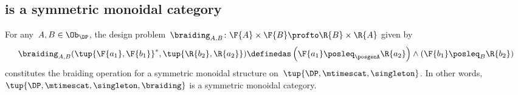 \subsection{\DP is a symmetric monoidal category}
\begin{lemma}
  \label{lem:symmetricmonoidaldp}
  For any~$A,B \in\Ob_\DP$, the design problem~$\braiding_{A,B}\colon \F{A} \times \F{B} \profto \R{B} \times \R{A}$ given by
  \begin{equation}
    \braiding_{A,B}(\tup{\F{a_1},\F{b_1}}^*,\tup{\R{b_2},\R{a_2}})\definedas \left(\F{a_1}\posleq_\posgenA \R{a_2}\right)\wedge \left(\F{b_1}\posleq_B \R{b_2}\right)
  \end{equation}
  constitutes the braiding operation for a symmetric monoidal structure on~$\tup{\DP,\mtimescat,\singleton}$. In other words,~$\tup{\DP, \mtimescat, \singleton, \braiding}$ is a symmetric monoidal category.
\end{lemma}


